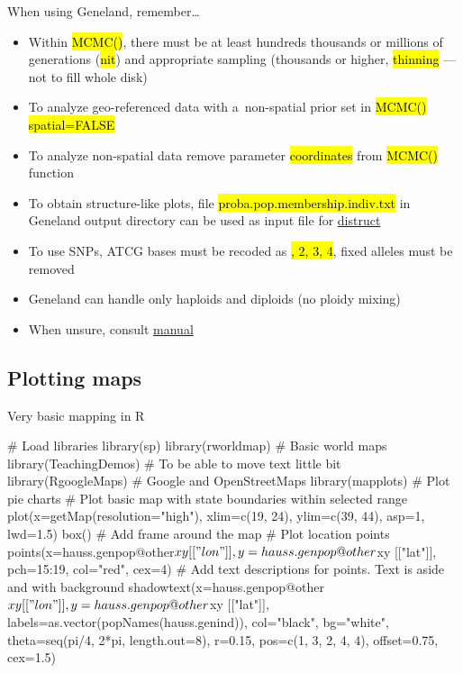\documentclass[compress, ucs, xelatex, 11pt, xcolor=svgnames,
	hyperref={
		bookmarks=true,
		unicode=true,
		colorlinks=true,
		pdftitle={Molecular data in R},
		plainpages=false,
		pdfauthor={Vojtech Zeisek},
		pdfsubject={Course about phylogeny and evolution in R},
		pdfcreator={XeLaTeX},
		pdfkeywords={R, evolution, phylogeny, molecular data},
		linkcolor=Tomato,
		anchorcolor=SaddleBrown,
		citecolor=Goldenrod,
		filecolor=DarkMagenta,
		menucolor=Sienna,
		urlcolor=DarkTurquoise,
		pdftex},
	url={hyphens, lowtilde} %
	]{beamer}
\renewcommand{\texttt}[1]{\hl{\ttfamily #1}}
\begin{document}
\begin{frame}{When using Geneland, remember\ldots}
	\begin{itemize}
		\item Within \texttt{MCMC()}, there must be at least hundreds thousands or millions of generations (\texttt{nit}) and appropriate sampling (thousands or higher, \texttt{thinning} --- not to fill whole disk)
		\item To analyze geo-referenced data with a~non-spatial prior set in \texttt{MCMC()} \texttt{spatial=FALSE}
		\item To analyze non-spatial data remove parameter \texttt{coordinates} from \texttt{MCMC()} function
		\item To obtain structure-like plots, file \texttt{proba.pop.membership.indiv.txt} in Geneland output directory can be used as input file for \href{https://web.stanford.edu/group/rosenberglab/distruct.html}{distruct}
		\item To use SNPs, ATCG bases must be recoded as \texttt{1, 2, 3, 4}, fixed alleles must be removed
		\item Geneland can handle only haploids and diploids (no ploidy mixing)
		\item When unsure, consult \href{https://i-pri.org/special/Biostatistics/Software/Geneland/Geneland-Doc.pdf}{manual}
	\end{itemize}
\end{frame}

\subsection{Plotting maps}

\begin{frame}[fragile]{Very basic mapping in R}
	\begin{spluscode}
    # Load libraries
    library(sp)
    library(rworldmap) # Basic world maps
    library(TeachingDemos) # To be able to move text little bit
    library(RgoogleMaps) # Google and OpenStreetMaps
    library(mapplots) # Plot pie charts
    # Plot basic map with state boundaries within selected range
    plot(x=getMap(resolution="high"), xlim=c(19, 24), ylim=c(39, 44),
      asp=1, lwd=1.5)
    box() # Add frame around the map
    # Plot location points
    points(x=hauss.genpop@other$xy[["lon"]], y=hauss.genpop@other$xy
      [["lat"]], pch=15:19, col="red", cex=4)
    # Add text descriptions for points. Text is aside and with background
    shadowtext(x=hauss.genpop@other$xy[["lon"]], y=hauss.genpop@other$xy
      [["lat"]], labels=as.vector(popNames(hauss.genind)), col="black",
      bg="white", theta=seq(pi/4, 2*pi, length.out=8), r=0.15,
      pos=c(1, 3, 2, 4, 4), offset=0.75, cex=1.5)
	\end{spluscode}
\end{frame}
\end{document}
